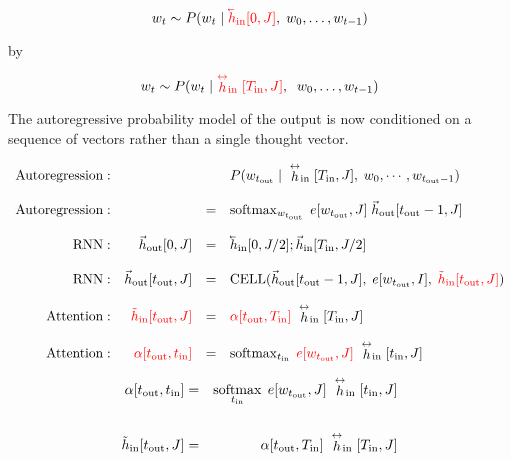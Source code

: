 {$$w_t \sim P(w_t\;|\;{\color{red} \cev{h}_{\mathrm{in}}[0,J]},\;w_0,\ldots,w_{t-1})$$

\vfill
by

$$w_t \sim P(w_t\;|\;{\color{red} \stackrel{\leftrightarrow}{h}_\mathrm{in}[T_{\mathrm{in}},J]},\;\;w_0,\ldots,w_{t-1})$$

\vfill
The autoregressive probability model of the output is now conditioned on a sequence of vectors rather than a single thought vector.

{\huge
$$\begin{array}{rrcl}
        \mathrm{Autoregression:}    &    & &    P(w_{t_\mathrm{out}}\;|\;\dvec{h}_\mathrm{in}[T_{\mathrm{in}},J],\;w_0,\cdots,w_{{t_\mathrm{out}}-1}) \\
        \\
        \mathrm{Autoregression:} &   & = & \softmax_{w_{t_\mathrm{out}}}\;e[w_{t_\mathrm{out}},J]\;\vec{h}_\mathrm{out}[t_\mathrm{out}-1,J] \\
   \\
   \mathrm{RNN:} &\vec{h}_\mathrm{out}[0,J] & = & \cev{h}_\mathrm{in}[0,J/2];\vec{h}_\mathrm{in}[T_\mathrm{in},J/2] \\
   \\
  \mathrm{RNN:} & \vec{h}_\mathrm{out}[t_\mathrm{out},J] & = & \mathrm{CELL}(\vec{h}_\mathrm{out}[t_{\mathrm{out}}-1,J],\;e[w_{t_\mathrm{out}},I],\;{\color{red} \tilde{h}_\mathrm{in}[t_\mathrm{out},J]}) \\
  \\
  \mathrm{Attention:} & {\color{red} \tilde{h}_\mathrm{in}[t_\mathrm{out},J]} & = & {\color{red} \alpha[t_\mathrm{out},T_{\mathrm{in}}]}\;\dvec{h}_\mathrm{in}[T_{\mathrm{in}},J] \\
  \\
  \mathrm{Attention:} & {\color{red} \alpha[t_\mathrm{out},t_{\mathrm{in}}]} & =& \softmax_{t_\mathrm{in}} \;{\color{red} e[w_{t_\mathrm{out}},J]}\;\dvec{h}_\mathrm{in}[t_{\mathrm{in}},J]
  \end{array}$$
}

\begin{eqnarray*}
  \alpha[t_\mathrm{out},t_{\mathrm{in}}]& =& \operatorname*{softmax}_{t_\mathrm{in}} \;e[w_{t_\mathrm{out}},J]\;\stackrel{\leftrightarrow}{h}_\mathrm{in}[t_{\mathrm{in}},J] \\
\\
\tilde{h}_\mathrm{in}[t_\mathrm{out},J]& = & \alpha[t_\mathrm{out},T_{\mathrm{in}}]\;\stackrel{\leftrightarrow}{h}_\mathrm{in}[T_{\mathrm{in}},J]
\end{eqnarray*}

}
